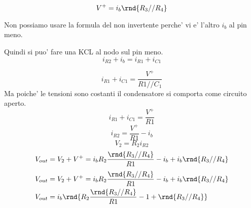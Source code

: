 \documentclass[\main/main.tex]{subfiles}
\begin{document}
\[V^+ = i_b \rnd{R_3 // R_4}\]

Non possiamo usare la formula del non invertente perche' vi e' l'altro $i_b$ al pin meno.

Quindi si puo' fare una KCL al nodo sul pin meno.
\[i_{R2} + i_b = i_{R1} + i_{C1}\]

\[i_{R1} + i_{C1}  = \frac{V^+}{R1//C_1}\]
Ma poiche' le tensioni sono costanti il condensatore si comporta come circuito aperto.
\[i_{R1} + i_{C1}  = \frac{V^+}{R1}\]
\[i_{R2} =  \frac{V^+}{R1} - i_b\]
\[V_2 = R_2 i_{R2}\]
\[V_{out} = V_2 + V^+ =  i_b R_2\frac{\rnd{R_3 // R_4}}{R1} - i_b + i_b \rnd{R_3 // R_4} \]
\begin{align*}
V_{out} &= V_2 + V^+ =  i_b R_2\frac{\rnd{R_3 // R_4}}{R1} - i_b + i_b \rnd{R_3 // R_4}\\
V_{out} &=  i_b \rnd{R_2\frac{\rnd{R_3 // R_4}}{R1} - 1+  \rnd{R_3 // R_4}}
\end{align*}
\end{document}
